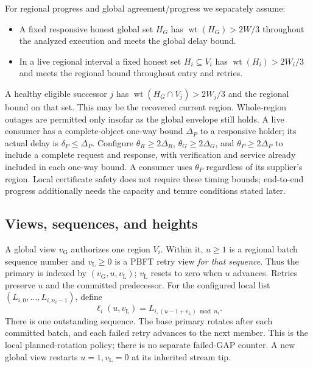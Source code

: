 \documentclass[11pt,a4paper,onecolumn]{article}
\newcommand{\gv}{v_{\mathrm G}}
\newcommand{\lv}{v_{\mathrm L}}
\newcommand{\wt}{\operatorname{wt}}
\theoremstyle{remark}\newtheorem{example}[definition]{Example}
\begin{document}
For regional progress and global agreement/progress we separately assume:
\begin{itemize}
\item A fixed responsive honest global set $H_G$ has $\wt(H_G)>2W/3$
throughout the analyzed execution and meets the global delay bound.
\item In a live regional interval a fixed honest set $H_i\subseteq V_i$ has
$\wt(H_i)>2W_i/3$ and meets the regional bound throughout entry and retries.
\end{itemize}
A healthy eligible successor $j$ has $\wt(H_G\cap V_j)>2W_j/3$ and the regional
bound on that set. This may be the recovered current region. Whole-region
outages are permitted only insofar as the global envelope still holds.
A live consumer has a complete-object one-way bound $\Delta_P$ to a responsive
holder; its actual delay is $\delta_P\leq\Delta_P$. Configure
$\theta_R\geq2\Delta_R$, $\theta_G\geq2\Delta_G$, and
$\theta_P\geq2\Delta_P$ to include a complete request and response, with
verification and service already included in each one-way bound. A consumer
uses $\theta_P$ regardless of its supplier's region.
Local certificate safety does not require these timing bounds; end-to-end
progress additionally needs the capacity and tenure conditions stated later.

\subsection{Views, sequences, and heights}\label{sec:indices}
A global view $\gv$ authorizes one region $V_i$. Within it, $u\geq1$ is a
regional batch sequence number and $\lv\geq0$ is a PBFT retry view \emph{for
that sequence}. Thus the primary is indexed by $(\gv,u,\lv)$; $\lv$ resets to
zero when $u$ advances. Retries preserve $u$ and the committed predecessor.
For the configured local list $(L_{i,0},\ldots,L_{i,n_i-1})$, define
\begin{equation}\label{eq:primary}
 \ell_i(u,\lv)=L_{i,(u-1+\lv)\bmod n_i}.
\end{equation}
There is one outstanding sequence. The base primary rotates after each
committed batch, and each failed retry advances to the next member. This is
the local planned-rotation policy; there is no separate failed-GAP counter.
A new global view restarts $u=1,\lv=0$ at its inherited stream tip.
\end{document}
